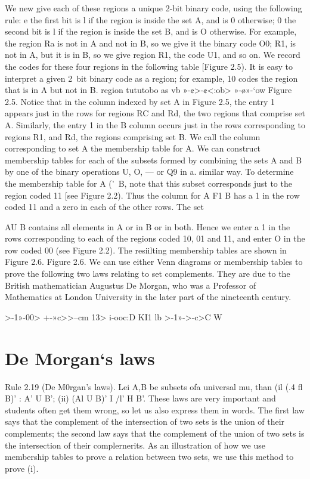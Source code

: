 \documentclass{beamer}
\begin{document}
\begin{frame}

We new give each of these regions a unique 2-bit binary code, using the following rule:
e the ﬁrst bit is l if the region is inside the set A, and is 0 otherwise;
0 the second bit is l if the region is inside the set B, and is O otherwise.
For example, the region Ra is not in A and not in B, so we give it the binary code O0; R1, is not
in A, but it is in B, so we give region R1, the code U1, and so on. We record the codes for these
four regions in the following table [Figure 2.5). It is easy to interpret a given 2~bit binary code as
a region; for example, 10 codes the region that is in A but not in B.
region
tututobo
as vb
»-¢>-¢<:ob>
»-\o»-‘ow
Figure 2.5.
Notice that in the column indexed by set A in Figure 2.5, the entry 1 appears just in the rows for
regions RC and Rd, the two regions that comprise set A. Similarly, the entry 1 in the B column
occurs just in the rows corresponding to regions R1, and Rd, the regions comprising set B. We call
the column corresponding to set A the membership table for A.
We can construct membership tables for each of the subsets formed by combining the sets A and B
by one of the binary operations U, O, — or Q9 in a. similar way. To determine the membership table
for A ('\ B, note that this subset corresponds just to the region coded 11 [see Figure 2.2). Thus
the column for A F1 B has a 1 in the row coded 11 and a zero in each of the other rows. The set

AU B contains all elements in A or in B or in both. Hence we enter a 1 in the rows corresponding
to each of the regions coded 10, 01 and 11, and enter O in the row coded 00 (see Figure 2.2). The
resiilting membership tables are shown in Figure 2.6.
Figure 2.6.
We can use either Venn diagrams or membership tables to prove the following two laws relating
to set complements. They are due to the British mathematician Augustus De Morgan, who was a
Professor of Mathematics at London University in the later part of the nineteenth century.

>-1»-00>
+-»c>>--cm
13>
i-ooc:D
KI1
lb
>-1»->-c>C
W
\section{De Morgan‘s laws}
Rule 2.19 (De M0rgan’s laws). Lei A,B be subsets ofa universal mu, than
(il (.4 fl B)’ : A’ U B’;
(ii) (Al U B)’ I /l’ H B’.
These laws are very important and students often get them wrong, so let us also express them in
words. The ﬁrst law says that the complement of the intersection of two sets is the union of their
complements; the second law says that the complement of the union of two sets is the intersection
of their complernerits.
As an illustration of how we use membership tables to prove a relation between two sets, we use
this method to prove (i).


\end{frame}
\end{document}
